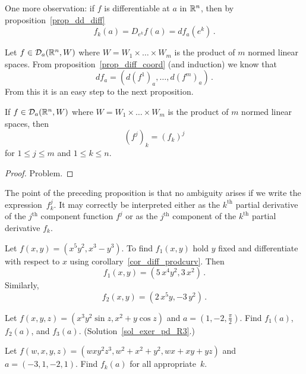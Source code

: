 One more observation: if $f$ is differentiable at $a$ in $\mathbb{R}^n$, then by
proposition~\ref{prop_dd_diff}
  \[ f_k(a) = D_{e^k}f(a) = df_a(e^k)\,. \]

Let $f \in \mathcal{D}_a(\mathbb{R}^n,W)$ where $W = W_1 \times \dots \times W_m$ is the product of $m$
normed linear spaces.  From proposition~\ref{prop_diff_coord} (and induction) we know that
  \[ df_a = \left(d(f^1)_a, \dots ,d(f^m)_a\right)\,. \]
From this it is an easy step to the next proposition.

\begin{prop}\label{prop_pd_vvf}  If $f \in \mathcal{D}_a(\mathbb{R}^n,W)$ where $W = W_1 \times \dots \times
W_m$ is the product of $m$ normed linear spaces, then
  \[ \left(f^j\right)_k = \left(f_k\right)^j \]
for $1 \le j \le m$ and $1 \le k \le n$.
\end{prop}

\begin{proof} Problem.   \ns  \end{proof}

The point of the preceding proposition is that no ambiguity arises if we write the
expression~$f^j_k$.  It may correctly be interpreted either as the $k^{\text {th}}$ partial
derivative of the $j^{\text {th}}$ component function $f^j$ or as the $j^{\text {th}}$
component of the $k^{\text {th}}$ partial derivative $f_k$.

\begin{exam}  Let $f(x,y) = (x^5y^2,x^3 - y^3)$.  To find $f_1(x,y)$ hold $y$ fixed and
differentiate with respect to $x$ using corollary~\ref{cor_diff_prodcurv}.  Then
  \[ f_1(x,y) = (5\,x^4y^2,3\,x^2)\,. \]
Similarly,
  \[ f_2(x,y) = (2\,x^5y,-3\,y^2)\,. \]
\end{exam}

\begin{exer}\label{exer_pd_R3} Let $f(x,y,z) = (x^3y^2\sin z, x^2 + y\cos z)$ and $a =
(1,-2,\frac\pi2)$.  Find $f_1(a)$, $f_2(a)$, and $f_3(a)$. (Solution~\ref{sol_exer_pd_R3}.)
\end{exer}

\begin{prob} Let $f(w,x,y,z) = (wxy^2z^3, w^2 + x^2 + y^2, wx + xy + yz)$ and $a = (-3,1,-2,1)$.
Find $f_k(a)$ for all appropriate~$k$.
\end{prob}


